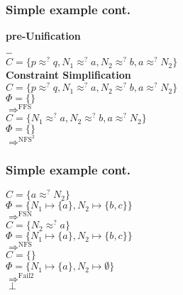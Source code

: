 	\begin{frame}[fragile=singleslide]
	\frametitle{Simple example cont.}
	\textbf{pre-Unification}\\
	\ldots \\
	\(C=\{p \approx^? q, N_1 \approx^? a, N_2 \approx^? b, a \approx^? N_2\}\)\\
	
	\vspace{0.5cm}
	\textbf{Constraint Simplification}\\
	\(C=\{p \approx^? q, N_1 \approx^? a, N_2 \approx^? b, a \approx^? N_2\}\)\\
	\(\Phi=\{\}\)\\
	\(\Rightarrow^{\text{FFS}}\)\\
	\(C=\{N_1 \approx^? a, N_2 \approx^? b, a \approx^? N_2\}\)\\
	\(\Phi=\{\}\)\\
	\(\Rightarrow^{\text{NFS}^2}\)\\
  \end{frame}	
	
	\begin{frame}[fragile=singleslide]
	\frametitle{Simple example cont.}
	\(C=\{ a \approx^? N_2\}\)\\
	\(\Phi=\{N_1\mapsto \{a\}, N_2\mapsto \{b,c\}\}\)\\
	\(\Rightarrow^{\text{FSN}}\)\\
	\(C=\{ N_2 \approx^? a\}\)\\
	\(\Phi=\{N_1\mapsto \{a\}, N_2\mapsto \{b,c\}\}\)\\
	\(\Rightarrow^{\text{NFS}}\)\\
	\(C=\{\}\)\\
	\(\Phi=\{N_1\mapsto \{a\}, N_2\mapsto \emptyset\}\)\\
	\(\Rightarrow^{\text{Fail2}}\)\\
	\(\perp\)
  \end{frame}
